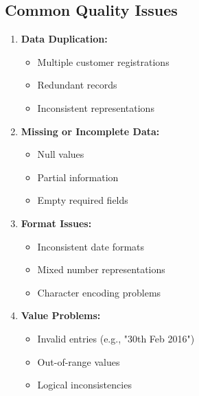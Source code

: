 \subsection{Common Quality Issues}
\begin{enumerate}
    \item \textbf{Data Duplication:}
        \begin{itemize}
            \item Multiple customer registrations
            \item Redundant records
            \item Inconsistent representations
        \end{itemize}
    \item \textbf{Missing or Incomplete Data:}
        \begin{itemize}
            \item Null values
            \item Partial information
            \item Empty required fields
        \end{itemize}
    \item \textbf{Format Issues:}
        \begin{itemize}
            \item Inconsistent date formats
            \item Mixed number representations
            \item Character encoding problems
        \end{itemize}
    \item \textbf{Value Problems:}
        \begin{itemize}
            \item Invalid entries (e.g., "30th Feb 2016")
            \item Out-of-range values
            \item Logical inconsistencies
        \end{itemize}
\end{enumerate}
